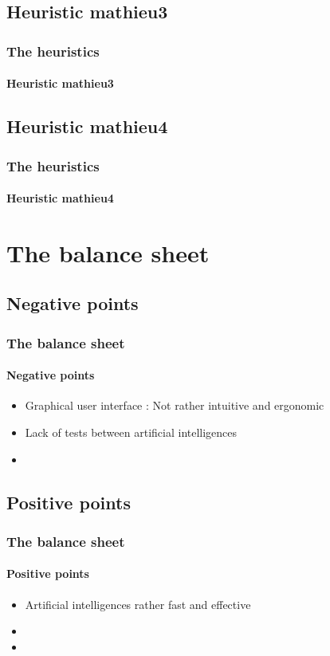 \documentclass[a4paper, 11pt]{beamer}
\begin{document}
\subsection{Heuristic mathieu3}
\begin{frame}
 \frametitle{The heuristics}
 \framesubtitle{Heuristic mathieu3}
 
\end{frame}

\subsection{Heuristic mathieu4}
\begin{frame}
 \frametitle{The heuristics}
 \framesubtitle{Heuristic mathieu4}
 
\end{frame}

\section{The balance sheet}
\subsection{Negative points}
\begin{frame}
 \frametitle{The balance sheet}
 \framesubtitle{Negative points}
 \begin{itemize}
  \item Graphical user interface : Not rather intuitive and ergonomic
  \item Lack of tests between artificial intelligences
  \item 
 \end{itemize}
\end{frame}

\subsection{Positive points}
\begin{frame}
 \frametitle{The balance sheet}
 \framesubtitle{Positive points}
 \begin{itemize}
  \item Artificial intelligences rather fast and effective
  \item 
  \item 
 \end{itemize}
\end{frame}
\end{document}
